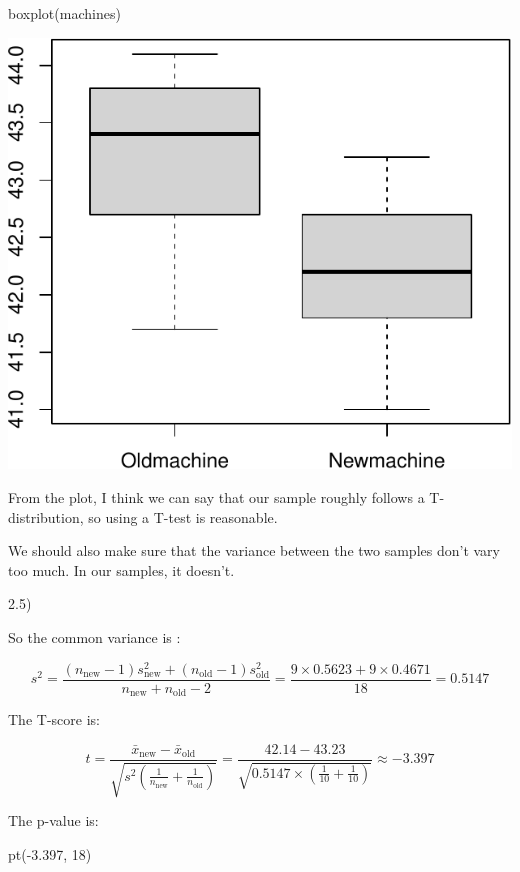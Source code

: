 \documentclass[
]{article}
\newenvironment{Shaded}{\begin{snugshade}}{\end{snugshade}}
\newcommand{\DecValTok}[1]{\textcolor[rgb]{0.00,0.00,0.81}{#1}}
\newcommand{\FloatTok}[1]{\textcolor[rgb]{0.00,0.00,0.81}{#1}}
\newcommand{\FunctionTok}[1]{\textcolor[rgb]{0.00,0.00,0.00}{#1}}
\newcommand{\NormalTok}[1]{#1}
\newcommand{\SpecialCharTok}[1]{\textcolor[rgb]{0.00,0.00,0.00}{#1}}
\begin{document}
\begin{Shaded}
\begin{Highlighting}[]
\FunctionTok{boxplot}\NormalTok{(machines)}
\end{Highlighting}
\end{Shaded}

\includegraphics{Homework6_files/figure-latex/unnamed-chunk-2-1.pdf}

From the plot, I think we can say that our sample roughly follows a
T-distribution, so using a T-test is reasonable.

We should also make sure that the variance between the two samples don't
vary too much. In our samples, it doesn't.

2.5)

So the common variance is :

\[
s^2 = \frac{(n_\text{new} - 1) s_\text{new}^2 + (n_\text{old} - 1) s_\text{old}^2}{n_\text{new} + n_\text{old} - 2} = \frac{9 \times 0.5623 + 9 \times 0.4671}{18} = 0.5147
\]

The T-score is:

\[
t = \frac{\bar{x}_\text{new} - \bar{x}_\text{old}}{\sqrt{s^2(\frac{1}{n_\text{new}} + \frac{1}{n_\text{old}})}} = \frac{42.14 - 43.23}{\sqrt{0.5147 \times(\frac{1}{10} + \frac{1}{10})}} \approx -3.397
\]

The p-value is:

\begin{Shaded}
\begin{Highlighting}[]
\FunctionTok{pt}\NormalTok{(}\SpecialCharTok{{-}}\FloatTok{3.397}\NormalTok{, }\DecValTok{18}\NormalTok{)}
\end{Highlighting}
\end{Shaded}
\end{document}

